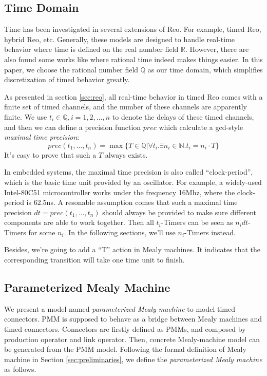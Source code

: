 \documentclass[conference, a4paper]{IEEEtran}
\begin{document}
\subsection{Time Domain}
Time has been investigated in several extensions of Reo. For example, timed
Reo\cite{DBLP:conf/sefm/ArbabBBR04, DBLP:conf/fmoods/MengA07}, hybrid Reo\cite{DBLP:conf/icfem/ChenSS14}, etc.
Generally, these models are designed to handle real-time behavior where time is defined on the
real number field $\mathbb{R}$. However, there are also found some works like
\cite{DBLP:journals/fmsd/PrabhakarDM015} where
rational time indeed  makes things easier. In this paper, we choose the rational number field
$\mathbb{Q}$ as our time domain, which simplifies discretization of timed behavior greatly.

As presented in section \ref{sec:reo}, all real-time behavior in timed Reo comes with a finite set
of timed channels, and the number of these channels are apparently finite. We use
$t_i\in\mathbb{Q}, i=1,2,\dots,n$ to denote the delays of these timed channels, and then we can define a precision
function $prec$ which calculate a gcd-style \emph{maximal time precision}:
\[
prec(t_1,\dots,t_n) = \max\{T\in\mathbb{Q}|\forall t_i.\exists n_i\in\mathbb{N}.t_i=n_i\cdot T\}
\]
It's easy to prove that such a $T$ always exists.

In embedded systems, the maximal time precision is also called ``clock-period'', which is the basic
time unit provided by an oscillator. For example, a widely-used Intel-80C51 microcontroller works
under the frequency 16Mhz, where the clock-period is $62.5$ns. A resonable assumption comes that
such a maximal time precision $dt=prec(t_1,\dots,t_n)$ should always be provided to make sure
different components are able to work together. Then all $t_i$-Timers can be seen as $n_idt$-Timers
for some $n_i$. In the following sections, we'll use $n_i$-Timers instead.

Besides, we're going to add a ``T'' action in Mealy machines. It indicates that the corresponding
transition will take one time unit to finish.

\subsection{Parameterized Mealy Machine}
We present a model named \emph{parameterized Mealy machine} to model timed connectors. PMM is
supposed to behave as a bridge between Mealy machines and timed connectors. Connectors are firstly
defined as PMMs, and composed by production operator and link operator. Then, concrete Mealy-machine
model can be generated from the PMM model.
Following the formal definition of Mealy machine in Section \ref{sec:preliminaries}, we define the
\emph{parameterized Mealy machine} as follows. 
\end{document}
